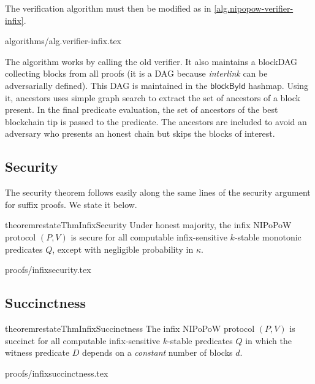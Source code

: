 The verification algorithm must then be modified as in
\ref{alg.nipopow-verifier-infix}.

{algorithms/alg.verifier-infix.tex}

The algorithm works by calling the old verifier. It also maintains a blockDAG
collecting blocks from all proofs (it is a DAG because \textit{interlink} can be
adversarially defined). This DAG is maintained in the $\textsf{blockById}$
hashmap. Using it, \textsf{ancestors} uses simple graph search to extract the
set of ancestors of a block present. In the final predicate evaluation, the set
of ancestors of the best blockchain tip is passed to the predicate. The
ancestors are included to avoid an adversary who presents an honest chain but
skips the blocks of interest.

\subsection{Security}
The security theorem follows easily along
the same lines of the security argument for suffix proofs. We state it below.
\begin{restatable}{theorem}{restateThmInfixSecurity}
\label{thm.infix-security}
Under honest majority, the infix NIPoPoW protocol $(P, V)$ is secure for all
computable infix-sensitive $k$-stable monotonic predicates $Q$, except with
negligible probability in $\kappa$.
\end{restatable}
{proofs/infixsecurity.tex}

\subsection{Succinctness}
\begin{restatable}{theorem}{restateThmInfixSuccinctness}
\label{thm.infix-succinctness}
The infix NIPoPoW protocol $(P, V)$ is succinct for all computable
infix-sensitive $k$-stable predicates $Q$ in which the witness predicate $D$
depends on a \emph{constant} number of blocks $d$.
\end{restatable}
{proofs/infixsuccinctness.tex}
